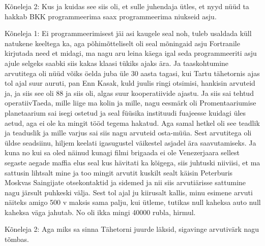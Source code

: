 Kõneleja 2:
Kus ja kuidas see siis oli, et sulle juhendaja ütles, et nyyd nüüd ta hakkab BKK programmeerima saax programmeerima niukseid asju.
                 
Kõneleja 1:
Ei programmeerimisest jäi asi kaugele seal noh, tuleb usaldada küll natukene keeltega ka, aga põhimõtteliselt oli seal mõningaid asju Fortranile kirjutada need et midagi, ma nagu aru leina käega igal seda programmeeriti asju ajule selgeks saabki siis kakas klaasi tükiks ajaks ära. Ja taaskohtumine arvutitega oli nüüd võiks öelda juba üle 30 aasta tagasi, kui Tartu tähetornis ajas tol ajal suur auruti, pan Enn Kasak, kuld juulis ringi otsimisi, hankisin arvuteid ja, ja siis see oli 88 ja siis oli, algas suur kooperatiivide ajastu. Ja siis sai tehtud operatiivTaeda, mille liige ma kolin ja mille, nagu eesmärk oli Promentaariumise planetaarium sai isegi ostetud ja seal füüsika instituudi fuajeesse kuidagi üles aetud, aga ei ole ka mingit tööd tegema hakatud. Aga samal hetkel oli see teadlik ja teaduslik ja mille varjus sai siis nagu arvuteid osta-müüa. Sest arvutitega oli üldse seadsiinu, hiljem keelati igasugustel väikestel asjadel ära saavutamiseks. Ja kuna no kui sa oled näinud kunagi filmi brigaada ei ole Venezerjaara sellest segaste aegade maffia elus seal kus hävitati ka kõigega, siis juhtuski niiviisi, et ma sattusin lihtsalt mine ja too mingit arvutit kuskilt sealt käisin Peterburis Moskvas Saingijate otsekontaktid ja sidemed ja nii siis arvutiärisse sattumine nagu järsult puhkeski välja. Sest tol ajal ju kiirusalt kallis, minu esimene arvuti näiteks amigo 500 v maksis sama palju, kui ütleme, tutikas null kaheksa auto null kaheksa väga jahutab. No oli ikka mingi 40000 rubla, hirmul.
                 
Kõneleja 2:
Aga miks sa sinna Tähetorni juurde läksid, sigavinge arvutivärk nagu tõmbas.
                 
